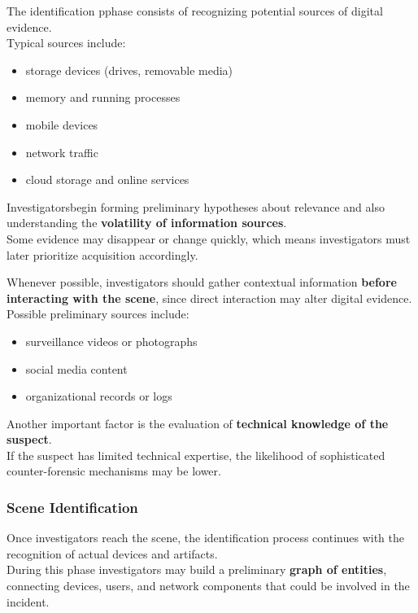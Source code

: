 The identification pphase consists of recognizing potential sources of digital evidence.\\
Typical sources include:

\begin{itemize}
\item storage devices (drives, removable media)
\item memory and running processes
\item mobile devices
\item network traffic
\item cloud storage and online services
\end{itemize}

\noindent
Investigatorsbegin forming preliminary hypotheses about relevance and also understanding the \textbf{volatility of information sources}. \\
Some evidence may disappear or change quickly, which means investigators must later prioritize acquisition accordingly.  

\medskip
\noindent
Whenever possible, investigators should gather contextual information \textbf{before interacting with the scene}, since direct interaction may alter digital evidence.
\\
Possible preliminary sources include:

\begin{itemize}
\item surveillance videos or photographs
\item social media content
\item organizational records or logs
\end{itemize}

\noindent
Another important factor is the evaluation of \textbf{technical knowledge of the suspect}.\\
If the suspect has limited technical expertise, the likelihood of sophisticated counter-forensic mechanisms may be lower.

\subsubsection{Scene Identification}

Once investigators reach the scene, the identification process continues with the recognition of actual devices and artifacts.\\
During this phase investigators may build a preliminary \textbf{graph of entities}, connecting devices, users, and network components that could be involved in the incident.

